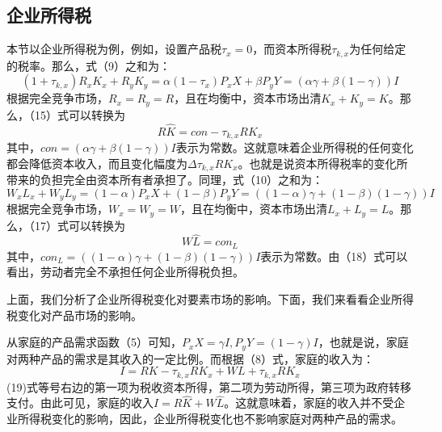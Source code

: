 \documentclass[cn,12pt,math=newtx,citestyle=gb7714-2015,bibstyle=gb7714-2015]{elegantbook}
\begin{document}
	\subsection{企业所得税}
	本节以企业所得税为例，例如，设置产品税$\tau_x=0$，而资本所得税$\tau_{k,x}$为任何给定的税率。那么，式（9）之和为：
	\begin{equation}
		(1+\tau_{k,x})R_xK_x+R_yK_y=\alpha(1-\tau_x)P_xX+\beta P_yY=(\alpha \gamma +\beta (1-\gamma)) I
	\end{equation}
	根据完全竞争市场，$R_x=R_y=R$，且在均衡中，资本市场出清$K_x+K_y=K$。那么，（15）式可以转换为
	\begin{equation}
		R\hat{K}=con-\tau_{k,x}RK_x
	\end{equation}
	其中，$con=(\alpha \gamma +\beta (1-\gamma)) I$表示为常数。这就意味着企业所得税的任何变化都会降低资本收入，而且变化幅度为$\Delta\tau_{k,x}RK_x$。也就是说资本所得税率的变化所带来的负担完全由资本所有者承担了。同理，式（10）之和为：
	\begin{equation}
		W_xL_x+W_yL_y=(1-\alpha)P_xX+(1-\beta) P_yY=((1-\alpha)\gamma +(1-\beta)(1-\gamma)) I
	\end{equation}
	根据完全竞争市场，$W_x=W_y=W$，且在均衡中，资本市场出清$L_x+L_y=L$。那么，（17）式可以转换为
	\begin{equation}
		W\hat{L}=con_L
	\end{equation}
	其中，$con_L=((1-\alpha)\gamma +(1-\beta)(1-\gamma)) I$表示为常数。由（18）式可以看出，劳动者完全不承担任何企业所得税负担。
	
	上面，我们分析了企业所得税变化对要素市场的影响。下面，我们来看看企业所得税变化对产品市场的影响。
	
	从家庭的产品需求函数（5）可知，$P_xX=\gamma I,P_yY=(1-\gamma)I$，也就是说，家庭对两种产品的需求是其收入的一定比例。而根据（8）式，家庭的收入为：
	\begin{equation}
		I=RK-\tau_{k,x}RK_x+WL+\tau_{k,x}RK_x
	\end{equation}
	(19)式等号右边的第一项为税收资本所得，第二项为劳动所得，第三项为政府转移支付。由此可见，家庭的收入$I=R\hat{K}+W\hat{L}$。这就意味着，家庭的收入并不受企业所得税变化的影响，因此，企业所得税变化也不影响家庭对两种产品的需求。
	
\end{document}
